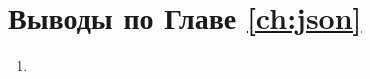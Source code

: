 
\section{Выводы по Главе \ref{ch:json}}
\label{sec:json.conclude}

\begin{enumerate}
  \item
\end{enumerate}
